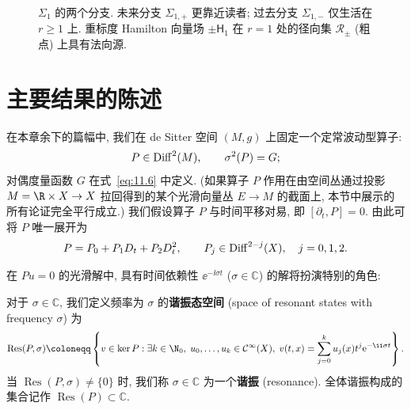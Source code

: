 \begin{figure}[htbp]
\centering
\drawFigElevenFour
\caption{$\Sigma_1$ 的两个分支. 未来分支 $\Sigma_{1, +}$ 更靠近读者; 过去分支 $\Sigma_{1, -}$ 仅生活在 $r \ge 1$ 上. 重标度 Hamilton 向量场 $\pm\mathsf{H}_1$ 在 $r = 1$ 处的径向集 $\mathcal{R}_\pm$ (粗点) 上具有法向源.}\label{fig:11.4}
\end{figure}


\section{主要结果的陈述}\label{sec:11.2}
%
%
%
%

在本章余下的篇幅中, 我们在 de Sitter 空间 $(M, g)$ 上固定一个定常波动型算子:
\begin{equation}\label{eq:11.31}
    P \in \operatorname{Diff}^2(M), \qquad \sigma^2(P) = G;
\end{equation}
对偶度量函数 $G$ 在式~\eqref{eq:11.6} 中定义. (如果算子 $P$ 作用在由空间丛通过投影 $M = \R \times X \to X$ 拉回得到的某个光滑向量丛 $E \to M$ 的截面上, 本节中展示的所有论证完全平行成立.) 我们假设算子 $P$ 与时间平移对易, 即 $[\partial_t, P] = 0$. 由此可将 $P$ 唯一展开为
\begin{equation}\label{eq:11.32}
    P = P_0 + P_1 D_t + P_2 D_t^2, \qquad P_j \in \operatorname{Diff}^{2-j}(X), \quad j = 0, 1, 2.
\end{equation}

在 $P u = 0$ 的光滑解中, 具有时间依赖性 $\ee^{-\ii \sigma t}$ ($\sigma \in \mathbb{C}$) 的解将扮演特别的角色:

\begin{definition}[谐振态]\label{def:11.7}
对于 $\sigma \in \mathbb{C}$, 我们定义频率为 $\sigma$ 的\textbf{谐振态空间} (space of resonant states with frequency $\sigma$) 为
\begin{equation}\label{eq:11.33}
    \operatorname{Res}(P, \sigma) \defeq \left\{ v \in \ker P : \exists k \in \N_0, \; u_0, \ldots, u_k \in \mathcal{C}^\infty(X), \; v(t, x) = \sum_{j=0}^k u_j(x) t^j \ee^{-\ii \sigma t} \right\}.
\end{equation}
当 $\operatorname{Res}(P, \sigma) \neq \{0\}$ 时, 我们称 $\sigma \in \mathbb{C}$ 为一个\textbf{谐振} (resonance). 全体谐振构成的集合记作 $\operatorname{Res}(P) \subset \mathbb{C}$.
\end{definition}


